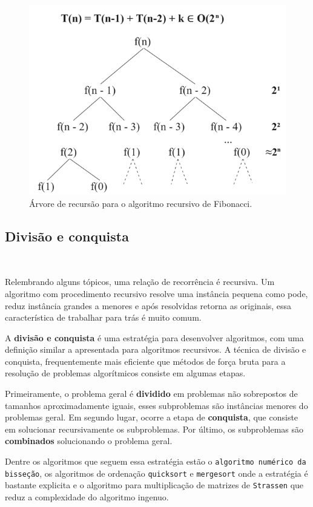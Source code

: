 \begin{figure}
  \centering
  \includegraphics[width=0.7\linewidth]{img/arvorerecursaofib.png}
    \caption{Árvore de recursão para o algoritmo recursivo de Fibonacci.}
    \label{arvorerecursaofib}
\end{figure}

\subsection{Divisão e conquista}
\

Relembrando alguns tópicos, uma relação de recorrência é recursiva. Um algoritmo com procedimento recursivo resolve uma instância pequena como pode, reduz instância grandes a menores e após resolvidas retorna as originais, essa característica de trabalhar para trás é muito comum.

A \textbf{divisão e conquista} é uma estratégia para desenvolver algoritmos, com uma definição similar a apresentada para algoritmos recursivos. A técnica de divisão e conquista, frequentemente mais eficiente que métodos de força bruta para a resolução de problemas algorítmicos consiste em algumas etapas.

Primeiramente, o problema geral é \textbf{dividido} em problemas não sobrepostos de tamanhos aproximadamente iguais, esses subproblemas são instâncias menores do problemas geral. Em segundo lugar, ocorre a etapa de \textbf{conquista}, que consiste em solucionar recursivamente os subproblemas. Por último, os subproblemas são \textbf{combinados} solucionando o problema geral.

Dentre os algoritmos que seguem essa estratégia estão o \texttt{algoritmo numérico da bisseção}, os algoritmos de ordenação \texttt{quicksort} e \texttt{mergesort} onde a estratégia é bastante explicita e o algoritmo para multiplicação de matrizes de \texttt{Strassen} que reduz a complexidade do algoritmo ingenuo.

